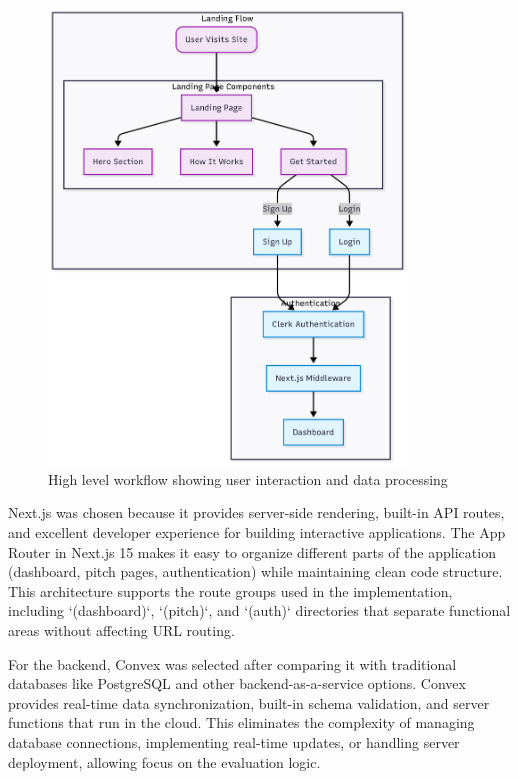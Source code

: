 \begin{figure}[H]
  \centering
  \includegraphics[width=0.85\textwidth]{img/user-diagram-flow}
\caption{High level workflow showing user interaction and data processing}
  \label{fig:user-flow}
\end{figure}

Next.js was chosen because it provides server-side rendering, built-in API routes, and excellent developer experience for building interactive applications. The App Router in Next.js 15 makes it easy to organize different parts of the application (dashboard, pitch pages, authentication) while maintaining clean code structure. This architecture supports the route groups used in the implementation, including `(dashboard)`, `(pitch)`, and `(auth)` directories that separate functional areas without affecting URL routing.

For the backend, Convex was selected after comparing it with traditional databases like PostgreSQL and other backend-as-a-service options. Convex provides real-time data synchronization, built-in schema validation, and server functions that run in the cloud. This eliminates the complexity of managing database connections, implementing real-time updates, or handling server deployment, allowing focus on the evaluation logic.

